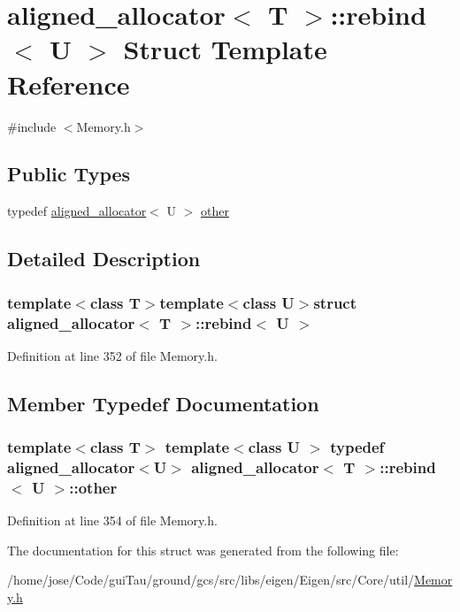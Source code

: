 \hypertarget{structaligned__allocator_1_1rebind}{\section{aligned\-\_\-allocator$<$ T $>$\-:\-:rebind$<$ U $>$ Struct Template Reference}
\label{structaligned__allocator_1_1rebind}
}


{\ttfamily \#include $<$Memory.\-h$>$}

\subsection*{Public Types}
\begin{DoxyCompactItemize}
\item 
typedef \hyperlink{classaligned__allocator}{aligned\-\_\-allocator}$<$ U $>$ \hyperlink{structaligned__allocator_1_1rebind_a6e53f20734eb817c9a1bd8874867a93d}{other}
\end{DoxyCompactItemize}


\subsection{Detailed Description}
\subsubsection*{template$<$class T$>$template$<$class U$>$struct aligned\-\_\-allocator$<$ T $>$\-::rebind$<$ U $>$}



Definition at line 352 of file Memory.\-h.



\subsection{Member Typedef Documentation}
\hypertarget{structaligned__allocator_1_1rebind_a6e53f20734eb817c9a1bd8874867a93d}{
\subsubsection[{other}]{\setlength{\rightskip}{0pt plus 5cm}template$<$class T$>$ template$<$class U $>$ typedef {\bf aligned\-\_\-allocator}$<$U$>$ {\bf aligned\-\_\-allocator}$<$ T $>$\-::{\bf rebind}$<$ U $>$\-::{\bf other}}}\label{structaligned__allocator_1_1rebind_a6e53f20734eb817c9a1bd8874867a93d}


Definition at line 354 of file Memory.\-h.



The documentation for this struct was generated from the following file\-:\begin{DoxyCompactItemize}
\item 
/home/jose/\-Code/gui\-Tau/ground/gcs/src/libs/eigen/\-Eigen/src/\-Core/util/\hyperlink{_memory_8h}{Memory.\-h}\end{DoxyCompactItemize}
